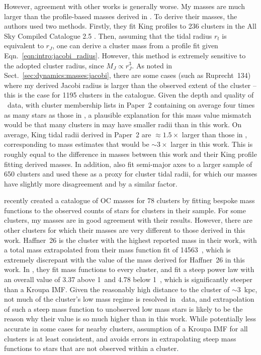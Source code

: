 However, agreement with other works is generally worse. My masses are much larger than the profile-based masses derived in \cite{piskunov_tidal_2008}. To derive their masses, the authors used two methods. Firstly, they fit King profiles to 236 clusters in the All Sky Compiled Catalogue 2.5 \cite{kharchenko_allsky_compiled_2001}. Then, assuming that the \cite{king_structure_star_1962} tidal radius $r_t$ is equivalent to $r_J$, one can derive a cluster mass from a profile fit given Eqn.~\ref{eqn:intro:jacobi_radius}. However, this method is extremely sensitive to the adopted cluster radius, since $M_J \propto r_J^3$. As noted in Sect.~\ref{sec:dynamics:masses:jacobi}, there are some cases (such as Ruprecht~134) where my derived Jacobi radius is larger than the observed extent of the cluster -- this is the case for 1195 clusters in the catalogue. Given the depth and quality of \gaia\ data, with cluster membership lists in Paper~2 containing on average four times as many stars as those in \cite{kharchenko_global_2013}, a plausible explanation for this mass value mismatch would be that many clusters in \cite{piskunov_tidal_2008} may have smaller radii than in this work. On average, King tidal radii derived in Paper~2 are $\approx 1.5\times$ larger than those in \cite{piskunov_tidal_2008}, corresponding to mass estimates that would be $\sim 3\times$ larger in this work. This is roughly equal to the difference in masses between this work and their King profile fitting derived masses. In addition, \cite{piskunov_tidal_2008} also fit semi-major axes to a larger sample of 650 clusters and used these as a proxy for cluster tidal radii, for which our masses have slightly more disagreement and by a similar factor.

\cite{cordoni_photometric_binaries_2023} recently created a catalogue of OC masses for 78 clusters by fitting bespoke mass functions to the observed counts of stars for clusters in their sample. For some clusters, my masses are in good agreement with their results. However, there are other clusters for which their masses are very different to those derived in this work. Haffner~26 is the cluster with the highest reported mass in their work, with a total mass extrapolated from their mass function fit of 14563~\MSun, which is extremely discrepant with the  value of the mass derived for Haffner~26 in this work. In \cite{cordoni_photometric_binaries_2023}, they fit mass functions to every cluster, and fit a steep power law with an overall value of 3.37 above 1~\MSun and 4.78 below 1~\MSun, which is significantly steeper than a Kroupa IMF. Given the reasonably high distance to the cluster of $\sim 3$~kpc, not much of the cluster's low mass regime is resolved in \gaia\ data, and extrapolation of such a steep mass function to unobserved low mass stars is likely to be the reason why their value is so much higher than in this work. While potentially less accurate in some cases for nearby clusters, assumption of a Kroupa IMF for all clusters is at least consistent, and avoids errors in extrapolating steep mass functions to stars that are not observed within a cluster.

